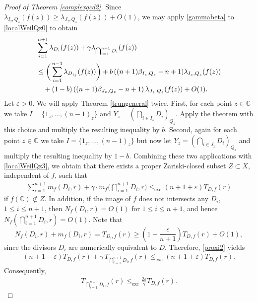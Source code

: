 \documentclass[10pt,a4paper]{amsart}
\begin{document}
\begin{proof}[Proof of Theorem \ref{complexgcd2}]
Since $\lambda_{   I_z,Q_z }(f(z))\ge \lambda_{ J_z,Q_z }(f(z))+O(1)$,
we may apply \eqref{gammabeta} to \eqref{localWeilQz0} to obtain
\begin{align}\label{localWeilQz3}
 & \sum_{i=1}^{n+1}\lambda_{ D_{i}}(f(z))+ \gamma \lambda_{\bigcap_{i=1}^{n+1}D_{i}} (f(z))  \notag\\
 &\le \bigg(\sum_{i=1}^{n-1}\lambda_{D_{i_z}}(f(z)) \bigg)+b\left((n+1)\beta_{I_z,Q_z}-n+1)\lambda_{I_z,Q_z}(f(z)\right) \notag\\
&\quad+(1-b)\left((n+1)\beta_{J_z,Q_z}-n+1\right)\lambda_{J_z,Q_z}(f(z))+O(1). 
\end{align}
Let $\varepsilon>0$.  We will apply Theorem \ref{trungeneral} twice.
First, for each point $z\in\mathbb C$ we take $I=\{1_z,\ldots,(n-1)_z \}$ and $Y_z=(\bigcap_{i \in I_z} D_{i})_{Q_z} $.  Apply the theorem with this choice and multiply the resulting inequality by $b$.
Second, again for each point $z\in\mathbb C$ we take  $I=\{1_z,\ldots,(n-1)_z \}$ but now let $Y_z=(\bigcap_{i \in J_z} D_{i})_{Q_z} $   and multiply the resulting inequality by $1-b$.
Combining these two applications with \eqref{localWeilQz3}, we obtain that there exists a proper Zariski-closed subset  $Z\subset X$, independent of $f$, such that  
\begin{align}\label{proxi2}
  \sum_{i=1}^{n+1}m_f(D_i,r)  +\gamma\cdot m_f\bigg( {\bigcap_{i=1}^{n+1} }  D_{i} ,r\bigg)   
    \leq_{\operatorname{exc}} (n+1+\varepsilon)T_{D,f}(r) 
\end{align}
if $f(\mathbb{C})\not\subset Z$. 
In addition, if the image of $f$ does not intersects any $D_i$, $1\le i\le n+1$, then  $N_f(D_i,r) =O(1)$ for  $1\le i\le n+1$, and hence $N_f({\bigcap_{i=1}^{n+1} }  D_{i},r) =O(1)$.
 Note that 
\begin{equation*}
    N_f(D_i,r)+ m_f(D_i,r) =T_{D_i,f}(r)  
\ge \left(1-\frac{\epsilon}{n+1}\right) T_{D,f}(r)+O(1),
\end{equation*}
since the divisors $D_i$ are numerically equivalent to $D$. Therefore, \eqref{proxi2} yields
\begin{align}\label{ht}
(n+1-\varepsilon)T_{D,f}(r)   
+\gamma\, T_{\bigcap_{i=1}^{n+1}D_{i},f}(r)   
\leq_{\operatorname{exc}} (n+1+\varepsilon)T_{D,f}(r).
\end{align}
 Consequently,
\begin{align*} 
 T_{{\bigcap_{i=1}^{n+1} }  D_{i},f}(r)   
    \leq_{\operatorname{exc}} \frac{2\varepsilon}{\gamma} T_{D,f}(r).
\end{align*}
\end{proof}
\end{document}
